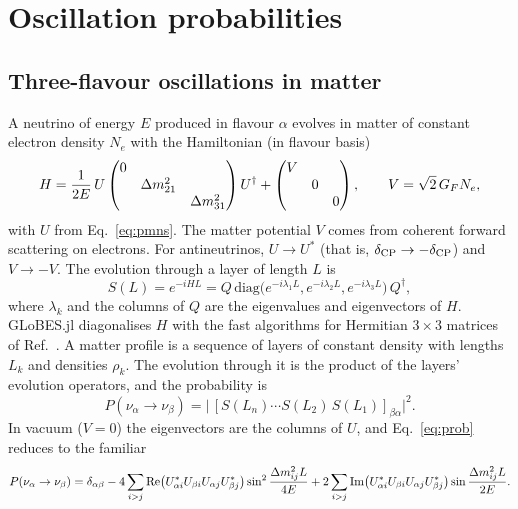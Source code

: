 \chapter{Oscillation probabilities}\label{ch:prob}

\section{Three-flavour oscillations in matter}

A neutrino of energy $E$ produced in flavour $\alpha$ evolves in matter of
constant electron density $N_e$ with the Hamiltonian (in flavour basis)
\begin{equation}
H = \frac{1}{2E}\,U \begin{pmatrix} 0&&\\ &\Delta m^2_{21}&\\ &&\Delta m^2_{31}\end{pmatrix} U^\dagger
  + \begin{pmatrix} V&&\\ &0&\\ &&0\end{pmatrix},
\qquad V = \sqrt2\,G_F N_e ,
\label{eq:hamiltonian}
\end{equation}
with $U$ from Eq.~\eqref{eq:pmns}. The matter potential $V$ comes from coherent
forward scattering on electrons. For antineutrinos, $U\to U^*$ (that is,
$\delta_\mathrm{CP}\to-\delta_\mathrm{CP}$) and $V\to-V$. The evolution through a layer of length $L$ is
\begin{equation}
S(L) = e^{-iHL} = Q\,\mathrm{diag}\bigl(e^{-i\lambda_1L},e^{-i\lambda_2L},e^{-i\lambda_3L}\bigr)\,Q^\dagger,
\end{equation}
where $\lambda_k$ and the columns of $Q$ are the eigenvalues and eigenvectors of
$H$. GLoBES.jl diagonalises $H$ with the fast algorithms for Hermitian
$3\times3$ matrices of Ref.~\cite{Kopp:2006wp}. A matter profile is a sequence of
layers of constant density with lengths $L_k$ and densities $\rho_k$. The
evolution through it is the product of the layers' evolution operators, and the
probability is
\begin{equation}
P(\nu_\alpha\to\nu_\beta) = \bigl|\,[S(L_n)\cdots S(L_2)\,S(L_1)]_{\beta\alpha}\bigr|^2 .
\label{eq:prob}
\end{equation}
In vacuum ($V=0$) the eigenvectors are the columns of $U$, and
Eq.~\eqref{eq:prob} reduces to the familiar
\begin{equation}
P(\nu_\alpha\to\nu_\beta) = \delta_{\alpha\beta}
  - 4\sum_{i>j}\mathrm{Re}\bigl(U_{\alpha i}^*U_{\beta i}U_{\alpha j}U_{\beta j}^*\bigr)\sin^2\frac{\Delta m^2_{ij}L}{4E}
  + 2\sum_{i>j}\mathrm{Im}\bigl(U_{\alpha i}^*U_{\beta i}U_{\alpha j}U_{\beta j}^*\bigr)\sin\frac{\Delta m^2_{ij}L}{2E}.
\end{equation}


